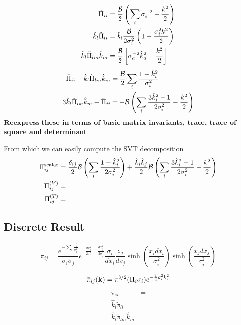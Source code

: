 \documentclass{revtex4}
\begin{document}
\begin{subequations}
\begin{align}
  \tilde{\Pi}_{ii} &= \frac{\mathcal{B}}{2}\left(\sum_i\sigma_i^{-2} - \frac{k^2}{2}\right) \\
  \hat{k}_l\tilde{\Pi}_{li} &= \hat{k}_i\frac{\mathcal{B}}{2\sigma_i^2}\left(1-\frac{\sigma_i^2k^2}{2}\right) \\
  \hat{k}_l\tilde{\Pi}_{lm}\hat{k}_m &= \frac{\mathcal{B}}{2}\left[\sigma_a^{-2}\hat{k}_a^2 -\frac{k^2}{2}\right] 
\end{align}
\end{subequations}
\begin{align}
  \tilde{\Pi}_{ii} - \hat{k}_l\tilde{\Pi}_{lm}\hat{k}_m &= \frac{\mathcal{B}}{2}\sum_i\frac{1-\hat{k}_i^2}{\sigma_i^2}\\
  3\hat{k}_l\tilde{\Pi}_{lm}\hat{k}_m - \tilde{\Pi}_{ii} &= -\mathcal{B}\left(\sum_i\frac{3\hat{k}_i^2-1}{2\sigma_i^2} - \frac{k^2}{2}\right)
\end{align}
    {\bf Reexpress these in terms of basic matrix invariants, trace, trace of square and determinant}
    

From which we can easily compute the SVT decomposition
\begin{subequations}
  \begin{align}
    \Pi_{ij}^{\rm scalar} &= \frac{\delta_{ij}}{2}\mathcal{B}\left(\sum_i\frac{1-\hat{k}_i^2}{2\sigma_i^2} \right) + \frac{\hat{k}_i\hat{k}_j}{2}\mathcal{B}\left(\sum_i\frac{3\hat{k}_i^2-1}{2\sigma_i^2}-\frac{k^2}{2}\right)\\
    \Pi_{ij}^{(V)} &= \\
    \Pi_{ij}^{(T)} &=
  \end{align}
\end{subequations}


\subsection{Discrete Result}
\begin{equation}
  \pi_{ij} = \frac{e^{-\sum_i\frac{x_i^2}{\sigma_i^2}}}{\sigma_i\sigma_j}e^{-\frac{dx_i^2}{2\sigma_i^2}-\frac{dx_j^2}{2\sigma_j^2}}\frac{\sigma_i}{dx_i}\frac{\sigma_j}{dx_j}\sinh\left(\frac{x_idx_i}{\sigma_i^2}\right)\sinh\left(\frac{x_jdx_j}{\sigma_j^2}\right)
\end{equation}

\begin{equation}
  \tilde{\pi}_{ij}({\bf k}) = \pi^{3/2}(\Pi_i\sigma_i)e^{-\frac{1}{4}\sigma_i^2k_i^2}
\end{equation}
\begin{subequations}
\begin{align}
  \tilde{\pi}_{ii} &= \\
  \hat{k}_l\tilde{\pi}_{li} &= \\
  \hat{k}_l\tilde{\pi}_{lm}\hat{k}_m &= 
\end{align}
\end{subequations}
\end{document}
